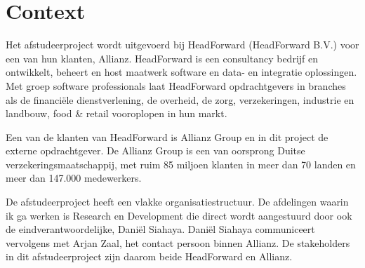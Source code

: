 \chapter{Context}
Het afstudeerproject wordt uitgevoerd bij HeadForward (HeadForward B.V.) voor een van hun klanten, Allianz. HeadForward is een consultancy bedrijf en ontwikkelt, beheert en host maatwerk software en data- en integratie oplossingen. Met groep software professionals laat HeadForward opdrachtgevers in branches als de financiële dienstverlening, de overheid, de zorg, verzekeringen, industrie en landbouw, food \& retail vooroplopen in hun markt.\par
Een van de klanten van HeadForward is Allianz Group en in dit project de externe opdrachtgever. De Allianz Group is een van oorsprong Duitse verzekeringsmaatschappij, met ruim 85 miljoen klanten in meer dan 70 landen en meer dan 147.000 medewerkers. \par
De afstudeerproject heeft een vlakke organisatiestructuur. De afdelingen waarin ik ga werken is Research en Development die direct wordt aangestuurd door ook de eindverantwoordelijke, Dani\"el Siahaya. Dani\"el Siahaya communiceert vervolgens met Arjan Zaal, het contact persoon binnen Allianz. De stakeholders in dit afstudeerproject zijn daarom beide HeadForward en Allianz.\par